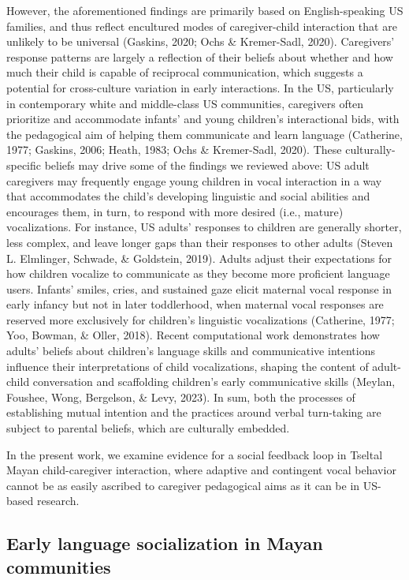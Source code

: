 \documentclass[
  man]{apa6}
\begin{document}
However, the aforementioned findings are primarily based on English-speaking US families, and thus reflect encultured modes of caregiver-child interaction that are unlikely to be universal (Gaskins, 2020; Ochs \& Kremer-Sadl, 2020). Caregivers' response patterns are largely a reflection of their beliefs about whether and how much their child is capable of reciprocal communication, which suggests a potential for cross-culture variation in early interactions. In the US, particularly in contemporary white and middle-class US communities, caregivers often prioritize and accommodate infants' and young children's interactional bids, with the pedagogical aim of helping them communicate and learn language (Catherine, 1977; Gaskins, 2006; Heath, 1983; Ochs \& Kremer-Sadl, 2020). These culturally-specific beliefs may drive some of the findings we reviewed above: US adult caregivers may frequently engage young children in vocal interaction in a way that accommodates the child's developing linguistic and social abilities and encourages them, in turn, to respond with more desired (i.e., mature) vocalizations. For instance, US adults' responses to children are generally shorter, less complex, and leave longer gaps than their responses to other adults (Steven L. Elmlinger, Schwade, \& Goldstein, 2019). Adults adjust their expectations for how children vocalize to communicate as they become more proficient language users. Infants' smiles, cries, and sustained gaze elicit maternal vocal response in early infancy but not in later toddlerhood, when maternal vocal responses are reserved more exclusively for children's linguistic vocalizations (Catherine, 1977; Yoo, Bowman, \& Oller, 2018). Recent computational work demonstrates how adults' beliefs about children's language skills and communicative intentions influence their interpretations of child vocalizations, shaping the content of adult-child conversation and scaffolding children's early communicative skills (Meylan, Foushee, Wong, Bergelson, \& Levy, 2023). In sum, both the processes of establishing mutual intention and the practices around verbal turn-taking are subject to parental beliefs, which are culturally embedded.

In the present work, we examine evidence for a social feedback loop in Tseltal Mayan child-caregiver interaction, where adaptive and contingent vocal behavior cannot be as easily ascribed to caregiver pedagogical aims as it can be in US-based research.

\hypertarget{early-language-socialization-in-mayan-communities}{%
\subsection{Early language socialization in Mayan communities}\label{early-language-socialization-in-mayan-communities}}
\end{document}
